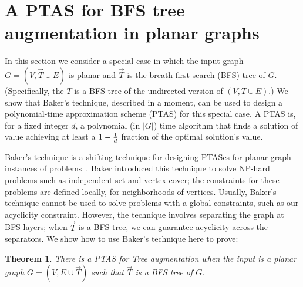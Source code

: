 \documentclass{article}
\newtheorem{theorem}{Theorem}
\newcommand{\ora}{\overrightarrow}
\begin{document}
\section{A PTAS for {\sc BFS tree augmentation} in planar graphs}
\label{sec:planar}

In this section we consider a special case in which the input graph
$G=(V,\ora T\cup E)$ is planar and $\ora T$ is the breath-first-search
(BFS) tree of $G$. (Specifically, the $T$ is a BFS tree of the
undirected version of $(V,T \cup E)$.)  We show that Baker's technique, described in a moment,
can be used to design a polynomial-time approximation scheme (PTAS)
for this special case.  A PTAS is, for a fixed
integer $d$, a polynomial (in $|G|$) time algorithm that finds a
solution of value achieving at least a $1-{1\over d}$ fraction of
the optimal solution's value.  


Baker's technique is a shifting technique for designing PTASes for
planar graph instances of problems~\cite{Baker1994}.  Baker introduced
this technique to solve NP-hard problems such as {\sc independent set}
and {\sc vertex cover}; the constraints for these problems are defined
locally, for neighborhoods of vertices.  Usually, Baker's technique
cannot be used to solve problems with a global constraints, such as
our acyclicity constraint.  However, the technique involves separating
the graph at BFS layers; when $\ora T$ is a BFS tree, we can guarantee
acyclicity across the separators.  We show how to use Baker's
technique here to prove:

\begin{theorem}\label{thm:planar} There is a PTAS for {\sc Tree augmentation} when the input is a planar graph $G = (V, E \cup \ora{T})$ such that $\ora T$ is a BFS tree of $G$.
\end{theorem}
\end{document}
